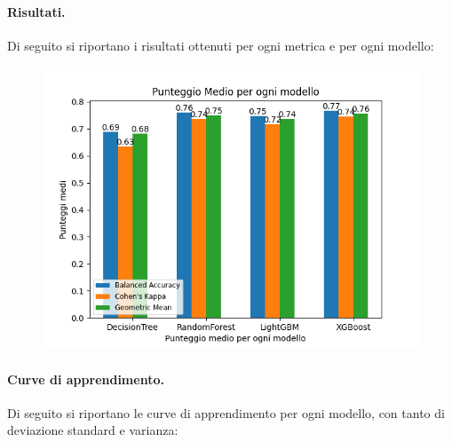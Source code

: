 \paragraph{Risultati.} Di seguito si riportano i risultati ottenuti per ogni metrica e per ogni modello:

\begin{figure}[H]
    \centering
    \includegraphics[scale=0.7]{img/adasyn_metrics.png}
\end{figure}

\paragraph{Curve di apprendimento.} Di seguito si riportano le curve di apprendimento per ogni modello, con tanto di deviazione standard e varianza:

